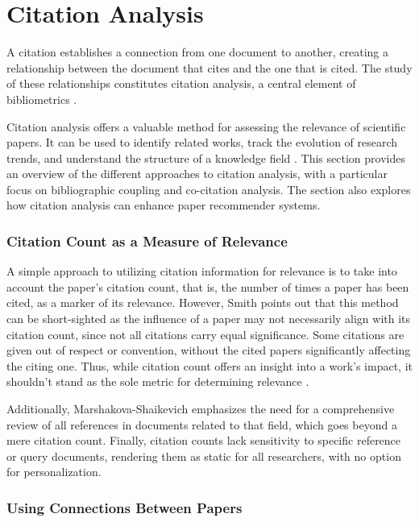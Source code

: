 \section{Citation Analysis} \label{sec:citation-analysis}

A citation establishes a connection from one document to another, creating a relationship between the document that cites and the one that is cited. The study of these relationships constitutes citation analysis, a central element of bibliometrics \cite{SmithCitationAnalysis1981}.

Citation analysis offers a valuable method for assessing the relevance of scientific papers. It can be used to identify related works, track the evolution of research trends, and understand the structure of a knowledge field \cite{Marshakova-ShaikevichSystemDocument1973}. This section provides an overview of the different approaches to citation analysis, with a particular focus on bibliographic coupling and co-citation analysis. The section also explores how citation analysis can enhance paper recommender systems.


\subsubsection*{Citation Count as a Measure of Relevance}

A simple approach to utilizing citation information for relevance is to take into account the paper's citation count, that is, the number of times a paper has been cited, as a marker of its relevance.
However, Smith \cite{SmithCitationAnalysis1981} points out that this method can be short-sighted as the influence of a paper may not necessarily align with its citation count, since not all citations carry equal significance. Some citations are given out of respect or convention, without the cited papers significantly affecting the citing one. Thus, while citation count offers an insight into a work's impact, it shouldn't stand as the sole metric for determining relevance \cite{SmithCitationAnalysis1981}.

Additionally, Marshakova-Shaikevich \cite{Marshakova-ShaikevichSystemDocument1973} emphasizes the need for a comprehensive review of all references in documents related to that field, which goes beyond a mere citation count.
Finally, citation counts lack sensitivity to specific reference or query documents, rendering them as static for all researchers, with no option for personalization.


\subsubsection*{Using Connections Between Papers}

